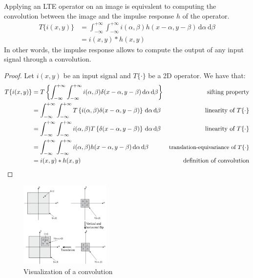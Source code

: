 \begin{theorem} 
    Applying an LTE operator on an image is equivalent to computing the convolution between the image and the impulse response $h$ of the operator.
    \[ 
        \begin{split}
            T\{ i(x, y) \} &= \int_{-\infty}^{+\infty}\int_{-\infty}^{+\infty} i(\alpha, \beta) h(x-\alpha, y-\beta) \,\text{d}\alpha\,\text{d}\beta \\
                &= i(x, y) * h(x, y) 
        \end{split}
    \]
    In other words, the impulse response allows to compute the output of any input signal through a convolution.
    \begin{proof}
        Let $i(x, y)$ be an input signal and $T\{ \cdot \}$ be a 2D operator.
        We have that:
        \begin{align*}
            T\{ i(x, y) \} 
                &= T\left\{ \int_{-\infty}^{+\infty}\int_{-\infty}^{+\infty} i(\alpha, \beta) \delta(x-\alpha, y-\beta) \,\text{d}\alpha\,\text{d}\beta \right\} 
                & \text{sifting property} \\
                &= \int_{-\infty}^{+\infty}\int_{-\infty}^{+\infty} T\left\{ i(\alpha, \beta) \delta(x-\alpha, y-\beta) \right\} \,\text{d}\alpha\,\text{d}\beta
                & \text{linearity of $T\{ \cdot \}$} \\
                &= \int_{-\infty}^{+\infty}\int_{-\infty}^{+\infty} i(\alpha, \beta) T\left\{ \delta(x-\alpha, y-\beta) \right\} \,\text{d}\alpha\,\text{d}\beta
                & \text{linearity of $T\{ \cdot \}$} \\
                &= \int_{-\infty}^{+\infty}\int_{-\infty}^{+\infty} i(\alpha, \beta) h(x-\alpha, y-\beta) \,\text{d}\alpha\,\text{d}\beta
                & \text{\small translation-equivariance of $T\{ \cdot \}$} \\
                &= i(x, y) * h(x, y) 
                & \text{definition of convolution} \\
        \end{align*}  
    \end{proof}
\end{theorem}

\begin{figure}[H]
    \centering
    \includegraphics[width=0.4\textwidth]{./img/_convolution_graphical.pdf}
    \caption{Visualization of a convolution}
\end{figure}


